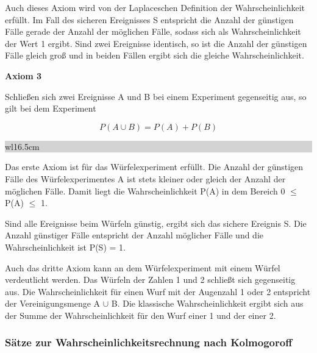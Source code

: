 \noindent Auch dieses Axiom wird von der Laplaceschen Definition der Wahrscheinlichkeit erf\"{u}llt. Im Fall des sicheren Ereignisses S entspricht die Anzahl der g\"{u}nstigen F\"{a}lle gerade der Anzahl der m\"{o}glichen F\"{a}lle, sodass sich als Wahrscheinlichkeit der Wert 1 ergibt. Sind zwei Ereignisse identisch, so ist die Anzahl der g\"{u}nstigen F\"{a}lle gleich gro{\ss} und in beiden F\"{a}llen ergibt sich die gleiche Wahrscheinlichkeit.\bigskip

{\selectfont
\noindent\textbf{Axiom 3}} \smallskip

\noindent Schlie{\ss}en sich zwei Ereignisse A und B bei einem Experiment gegenseitig aus, so gilt bei dem Experiment

\begin{equation}\label{eq:twofourtyone}
P(A\cup B)=P(A)+P(B)
\end{equation}

\noindent
\colorbox{lightgray}{%
%
\renewcommand\arraystretch{0.6}%
\begin{tabular}{ wl{16.5cm} }
{\selectfont
{}}
\end{tabular}%
}\bigskip

\noindent Das erste Axiom ist f\"{u}r das W\"{u}rfelexperiment erf\"{u}llt. Die Anzahl der g\"{u}nstigen F\"{a}lle des W\"{u}rfelexperimentes A ist stets kleiner oder gleich der Anzahl der m\"{o}glichen F\"{a}lle. Damit liegt die Wahrscheinlichkeit P(A) in dem Bereich 0 $\leq$ P(A) $\leq$ 1.\newline

\noindent Sind alle Ereignisse beim W\"{u}rfeln g\"{u}nstig, ergibt sich das sichere Ereignis S. Die Anzahl g\"{u}nstiger F\"{a}lle entspricht der Anzahl m\"{o}glicher F\"{a}lle und die Wahrscheinlichkeit ist P(S) = 1. \newline

\noindent Auch das dritte Axiom kann an dem W\"{u}rfelexperiment mit einem W\"{u}rfel verdeutlicht werden. Das W\"{u}rfeln der Zahlen 1 und 2 schlie{\ss}t sich gegenseitig aus. Die Wahrscheinlichkeit f\"{u}r einen Wurf mit der Augenzahl 1 oder 2 entspricht der Vereinigungsmenge A $\cup$ B. Die klassische Wahrscheinlichkeit ergibt sich aus der Summe der Wahrscheinlichkeit f\"{u}r den Wurf einer 1 und der einer 2.

\subsubsection{S\"{a}tze zur Wahrscheinlichkeitsrechnung nach Kolmogoroff}

